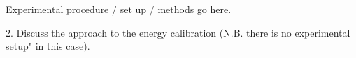 Experimental procedure / set up / methods go here.

2. Discuss the approach to the energy calibration (N.B. there is no experimental setup" in this case).

